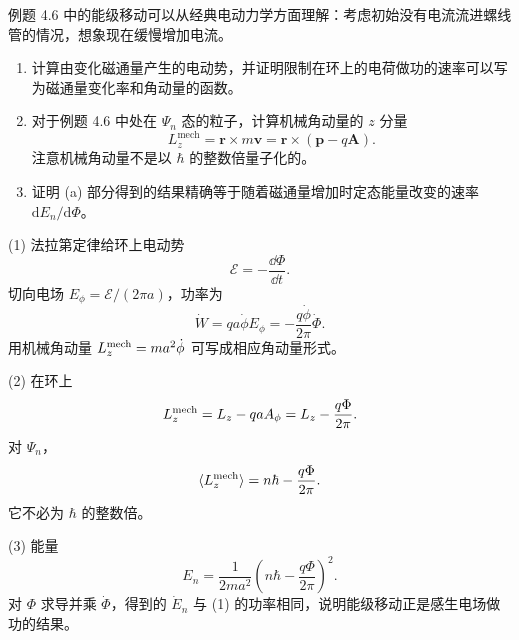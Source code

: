 \begin{question}
例题 4.6 中的能级移动可以从经典电动力学方面理解：考虑初始没有电流流进螺线管的情况，想象现在缓慢增加电流。
\begin{enumerate}
\item 计算由变化磁通量产生的电动势，并证明限制在环上的电荷做功的速率可以写为磁通量变化率和角动量的函数。
\item 对于例题 4.6 中处在 $\Psi_n$ 态的粒子，计算机械角动量的 $z$ 分量
\[
L_z^{\mathrm{mech}}=\mathbf r\times m\mathbf v=\mathbf r\times(\mathbf p-q\mathbf A).
\]
注意机械角动量不是以 $\hbar$ 的整数倍量子化的。
\item 证明 (a) 部分得到的结果精确等于随着磁通量增加时定态能量改变的速率 $\mathrm dE_n/\mathrm d\Phi$。
\end{enumerate}
\end{question}
\begin{solution}

(1) 法拉第定律给环上电动势
\[
\mathcal E=-\frac{\dd\Phi}{\dd t}.
\]
切向电场 $E_\phi=\mathcal E/(2\pi a)$，功率为
\[
\dot W=q a\dot\phi E_\phi=-\frac{q\dot\phi}{2\pi}\dot\Phi.
\]
用机械角动量 $L_z^{\rm mech}=ma^2\dot\phi$ 可写成相应角动量形式。

(2) 在环上
\[
L_z^{\rm mech}=L_z-q a A_\phi=L_z-\frac{q\Phi}{2\pi}.
\]
对 $\Psi_n$，
\[
\langle L_z^{\rm mech}\rangle=n\hbar-\frac{q\Phi}{2\pi}.
\]
它不必为 $\hbar$ 的整数倍。

(3) 能量
\[
E_n=\frac{1}{2ma^2}\left(n\hbar-\frac{q\Phi}{2\pi}\right)^2.
\]
对 $\Phi$ 求导并乘 $\dot\Phi$，得到的 $\dot E_n$ 与 (1) 的功率相同，说明能级移动正是感生电场做功的结果。

\end{solution}
